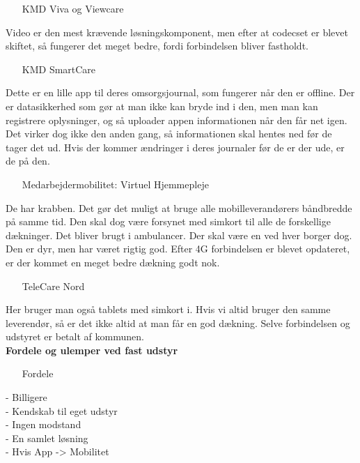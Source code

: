 \begin{itemize}
\item[KMD Viva og Viewcare]
\end{itemize}
Video er den mest krævende løsningskomponent, men efter at codecset er blevet skiftet, så fungerer det meget bedre, fordi forbindelsen bliver fastholdt.\\ 
\begin{itemize}
\item[KMD SmartCare]
\end{itemize}
Dette er en lille app til deres omsorgsjournal, som fungerer når den er offline. Der er datasikkerhed som gør at man ikke kan bryde ind i den, men man kan registrere oplysninger, og så uploader appen informationen når den får net igen. Det virker dog ikke den anden gang, så informationen skal hentes ned før de tager det ud. Hvis der kommer ændringer i deres journaler før de er der ude, er de på den.\\
\begin{itemize}
\item[Medarbejdermobilitet: Virtuel Hjemmepleje]
\end{itemize}
De har krabben. Det gør det muligt at bruge alle mobilleverandørers båndbredde på samme tid. Den skal dog være forsynet med simkort til alle de forskellige dækninger. Det bliver brugt i ambulancer. Der skal være en ved hver borger dog. Den er dyr, men har været rigtig god. Efter 4G forbindelsen er blevet opdateret, er der kommet en meget bedre dækning godt nok. \\
\begin{itemize}
\item[TeleCare Nord]
\end{itemize}
Her bruger man også tablets med simkort i. Hvis vi altid bruger den samme leverendør, så er det ikke altid at man får en god dækning. Selve forbindelsen og udstyret er betalt af kommunen.\\
\textbf{Fordele og ulemper ved fast udstyr}\\
\begin{itemize}
\item[Fordele]
\end{itemize}
- Billigere\\
- Kendskab til eget udstyr\\
- Ingen modstand\\
- En samlet løsning\\ 
- Hvis App -> Mobilitet\\
\\
